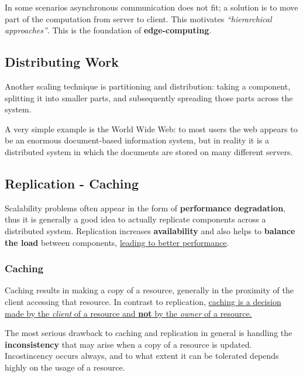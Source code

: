 In some scenarios asynchronous communication does not fit; a solution is to move part of the computation from server to client. This motivates \textit{``hierarchical approaches''}. This is the foundation of \textbf{edge-computing}.


\subsection{Distributing Work}

Another scaling technique is partitioning and distribution: taking a component, splitting it into smaller parts, and subsequently spreading those parts across the system.

A very simple example is the World Wide Web: to most users the web appears to be an enormous document-based information system, but in reality it is a distributed system in which the documents are stored on many different servers.

\subsection{Replication - Caching}
Scalability problems often appear in the form of \textbf{performance degradation}, thus it is generally a good idea to actually replicate components across a distributed system. Replication increases \textbf{availability} and also helps to \textbf{balance the load} between components, \ul{leading to better performance}.

\subsubsection{Caching}
Caching results in making a copy of a resource, generally in the proximity of the client accessing that resource. In contrast to replication, \ul{caching is a decision made by the \textit{client} of a resource and \textbf{not} by the \textit{owner} of a resource.}

The most serious drawback to caching and replication in general is handling the \textbf{inconsistency} that may arise when a copy of a resource is updated.
Incostincency occurs always, and to what extent it can be tolerated depends highly on the usage of a resource.

